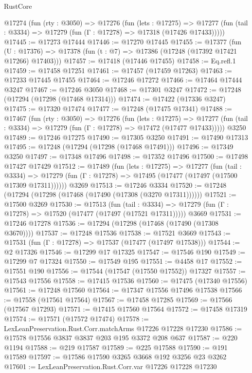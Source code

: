 \begin{lexlean}{RustCore}
\begin{coremodule}
  @17274
    (fun (rty : @3050) =>
    @17276
      (fun (lets : @17275) =>
      @17277 (fun (tail : @3334) => @17279 (fun (Γ : @17278) => @17318 (@17426 @17433)))))
@17445 := @17273 @17444
@17446 := @17270 @17445
@17455 := @17377
    (fun (U : @17376) => @17378 (fun (t : @7) => @17386 (@17248 (@17392 @17421 @17266) @17403)))
@17457 := @17418 (@17446 @17455)
@17458 := Eq.refl.{1}
@17459 := @17458 @17251
@17461 := @17457 (@17459 @17263)
@17463 := @17233 @17445 @17455
@17464 := @17246 @17272
@17466 := @17464 @17444 @3247
@17467 := @17246 @3050
@17468 := @17301 @3247
@17472 := @17248 (@17294 (@17298 (@17468 @17314)))
@17474 := @17422 (@17336 @3247)
@17475 := @17320 @17474
@17477 := @17248 (@17475 @17341)
@17488 := @17467
    (fun (rty : @3050) =>
    @17276
      (fun (lets : @17275) =>
      @17277 (fun (tail : @3334) => @17279 (fun (Γ : @17278) => @17472 (@17477 @17433)))))
    @3250
@17489 := @17246 @17275
@17490 := @17305 @3250
@17491 := @17490 @17313
@17495 := @17248 (@17294 (@17298 (@17468 @17491)))
@17496 := @17349 @3250
@17497 := @17348 @17496
@17498 := @17352 @17496
@17500 := @17498 @17427 @17429
@17512 := @17489
    (fun (lets : @17275) =>
    @17277
      (fun (tail : @3334) =>
      @17279 (fun (Γ : @17278) => @17495 (@17477 (@17497 (@17500 @17309 @17311))))))
    @3269
@17513 := @17246 @3334
@17520 := @17248 (@17294 (@17298 (@17468 (@17490 (@17308 (@3270 @17311))))))
@17521 := @17500 @3269
@17530 := @17513
    (fun (tail : @3334) => @17279 (fun (Γ : @17278) => @17520 (@17477 (@17497 (@17521 @17311)))))
    @3669
@17531 := @17246 @17278
@17536 := @17294 (@17298 (@17468 (@17490 (@17308 @3670))))
@17537 := @17248 @17536
@17538 := @17521 @3669
@17543 := @17531 (fun (Γ : @17278) => @17537 (@17477 (@17497 @17538)))
@17544 := @2 @17326
@17546 := @17299 @17 @17325
@17547 := @17546 @190
@17549 := @17299 @7 @17324
@17550 := @17549 @195
@17551 := @4458 @17
@17552 := @17551 @190
@17556 := @17544 (@17547 (@17550 @17552)) @17327
@17557 := @17543 @17556
@17558 := @17415 @17536
@17560 := @17475 (@17340 @17556)
@17561 := @17248 @17560
@17564 := @17347 @17556 @17496 @17538
@17566 := @17558 (@17561 @17564)
@17567 := @17458 @17285
@17569 := @17566 (@17567 @17293)
@17571 := @17415 @17560 @17564
@17572 := @17458 @17319
@17574 := @17571 (@17572 @17474)
@17578 := LexLeanPreservation.Rust.Corr.matchArms @17226 @17228 @17230
@17586 := @17578 @17556 @3837 @3837 @203 @195 @3372 @208 @637
@17587 := @220 @1194
@17588 := @219 @17587
@17589 := @225 @17588
@17590 := @191 @17589
@17597 := @17586 @17590 @3265 @3668 @192 @3256 @23 @3262
@17601 := LexLeanPreservation.Rust.Corr.var @17226 @17228 @17230

\end{coremodule}
\end{lexlean}
